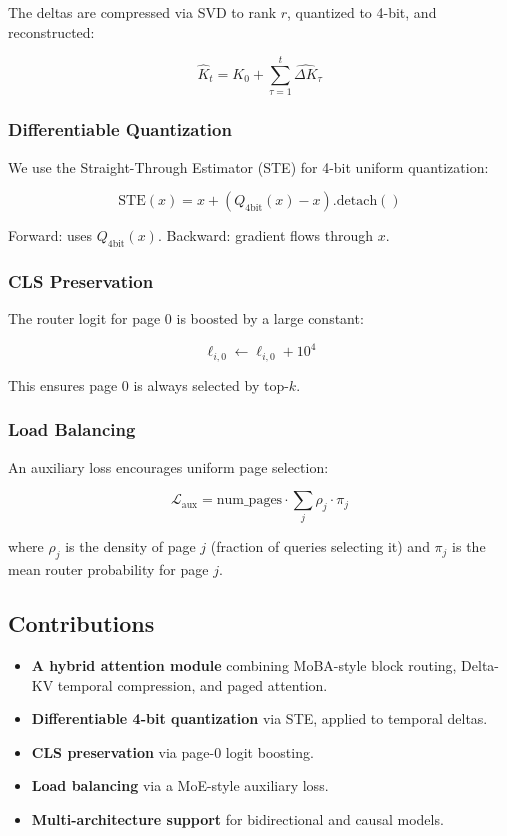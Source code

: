The deltas are compressed via SVD to rank $r$, quantized to 4-bit, and 
reconstructed:

\[
\hat{K}_t = K_0 + \sum_{\tau=1}^t \widehat{\Delta K}_\tau
\tag{1.4}
\]

\subsubsection{Differentiable Quantization}

We use the Straight-Through Estimator (STE) for 4-bit uniform quantization:

\[
\text{STE}(x) = x + (Q_{4\text{bit}}(x) - x).\text{detach}()
\tag{1.5}
\]

Forward: uses $Q_{4\text{bit}}(x)$. Backward: gradient flows through $x$.

\subsubsection{CLS Preservation}

The router logit for page 0 is boosted by a large constant:

\[
\ell_{i, 0} \leftarrow \ell_{i, 0} + 10^4
\tag{1.6}
\]

This ensures page 0 is always selected by top-$k$.

\subsubsection{Load Balancing}

An auxiliary loss encourages uniform page selection:

\[
\mathcal{L}_\text{aux} = \text{num\_pages} \cdot \sum_{j} \rho_j \cdot \pi_j
\tag{1.7}
\]

where $\rho_j$ is the density of page $j$ (fraction of queries selecting it) 
and $\pi_j$ is the mean router probability for page $j$.

\subsection{Contributions}

\begin{itemize}
\item \textbf{A hybrid attention module} combining MoBA-style block routing, Delta-KV
  temporal compression, and paged attention.
\item \textbf{Differentiable 4-bit quantization} via STE, applied to temporal deltas.
\item \textbf{CLS preservation} via page-0 logit boosting.
\item \textbf{Load balancing} via a MoE-style auxiliary loss.
\item \textbf{Multi-architecture support} for bidirectional and causal models.

\end{itemize}
